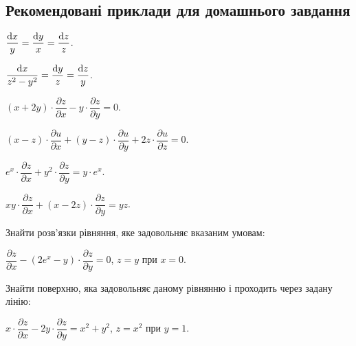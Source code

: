 \subsection*{Рекомендовані приклади для домашнього завдання}

\begin{problem}
	$\dfrac{\mathop{}\!\mathrm{d} x}{y} = \dfrac{\mathop{}\!\mathrm{d} y}{x} = \dfrac{\mathop{}\!\mathrm{d} z}{z}$.
\end{problem}

\begin{problem}
	$\dfrac{\mathop{}\!\mathrm{d} x}{z^2 - y^2} = \dfrac{\mathop{}\!\mathrm{d} y}{z} = \dfrac{\mathop{}\!\mathrm{d} z}{y}$. 
\end{problem}

\begin{problem}
	$(x + 2 y) \cdot \dfrac{\partial z}{\partial x} - y \cdot \dfrac{\partial z}{\partial y} = 0$.
\end{problem}

\begin{problem}
	$(x - z) \cdot \dfrac{\partial u}{\partial x} + (y - z) \cdot \dfrac{\partial u}{\partial y} + 2 z \cdot \dfrac{\partial u}{\partial z} = 0$.
\end{problem}

\begin{problem}
	$e^x \cdot \dfrac{\partial z}{\partial x} + y^2 \cdot \dfrac{\partial z}{\partial y} = y \cdot e^x$.
\end{problem}

\begin{problem}
	$x y \cdot \dfrac{\partial z}{\partial x} + (x - 2 z) \cdot \dfrac{\partial z}{\partial y} = y z$.
\end{problem}

Знайти розв'язки рівняння, яке задовольняє вказаним умовам:

\begin{problem}
	$\dfrac{\partial z}{\partial x} - (2 e^x - y) \cdot \dfrac{\partial z}{\partial y} = 0$, $z = y$ при $x = 0$.
\end{problem}

Знайти поверхню, яка задовольняє даному рівнянню і проходить через задану лінію:

\begin{problem}
	$x \cdot \dfrac{\partial z}{\partial x} - 2 y \cdot \dfrac{\partial z}{\partial y} = x^2 + y^2$, $z = x^2$ при $y = 1$.
\end{problem}
